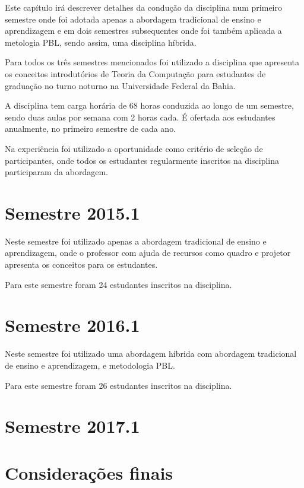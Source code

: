 \acresetall

Este capítulo irá descrever detalhes da condução da disciplina num primeiro
semestre onde foi adotada apenas a abordagem tradicional de ensino e aprendizagem e
em dois semestres subsequentes onde foi também aplicada a metologia PBL, sendo assim,
uma disciplina híbrida.

Para todos os três semestres mencionados foi utilizado a disciplina que apresenta os
conceitos introdutórios de Teoria da Computação para estudantes de graduação no turno noturno
na Universidade Federal da Bahia.

A disciplina tem carga horária de 68 horas conduzida ao longo de um semestre, sendo duas
aulas por semana com 2 horas cada.
É ofertada aos estudantes anualmente, no primeiro semestre de cada ano.

Na experiência foi utilizado a oportunidade como critério de seleção de participantes, onde todos os
estudantes regularmente inscritos na disciplina participaram da abordagem.

\section{Semestre 2015.1}
Neste semestre foi utilizado apenas a abordagem tradicional de ensino e aprendizagem, onde o professor
com ajuda de recursos como quadro e projetor apresenta os conceitos para os estudantes.

Para este semestre foram 24 estudantes inscritos na disciplina.

\section{Semestre 2016.1}

Neste semestre foi utilizado uma abordagem híbrida com abordagem tradicional de ensino
e aprendizagem, e metodologia PBL.

Para este semestre foram 26 estudantes inscritos na disciplina.

\section{Semestre 2017.1}
\section{Considerações finais}
